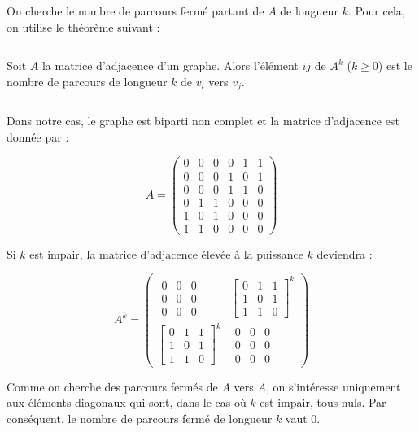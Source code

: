 \begin{solution}
On cherche le nombre de parcours fermé partant de $A$ de longueur $k$.
Pour cela, on utilise le théorème suivant :

$\,$

Soit $A$ la matrice d'adjacence d'un graphe. Alors l'élément $ij$
de $A^{k}$ ($k\geq0$) est le nombre de parcours de longueur $k$
de $v_{i}$ vers $v_{j}$.

$\,$

Dans notre cas, le graphe est biparti non complet et la matrice d'adjacence
est donnée par :

\[
A=\left(\begin{array}{cccccc}
0 & 0 & 0 & 0 & 1 & 1\\
0 & 0 & 0 & 1 & 0 & 1\\
0 & 0 & 0 & 1 & 1 & 0\\
0 & 1 & 1 & 0 & 0 & 0\\
1 & 0 & 1 & 0 & 0 & 0\\
1 & 1 & 0 & 0 & 0 & 0
\end{array}\right)
\]


Si $k$ est impair, la matrice d'adjacence élevée à la puissance $k$
deviendra :

\[
A^{k}=\left(\begin{array}{cc}
\begin{array}{ccc}
0 & 0 & 0\\
0 & 0 & 0\\
0 & 0 & 0
\end{array} & \left[\begin{array}{ccc}
0 & 1 & 1\\
1 & 0 & 1\\
1 & 1 & 0
\end{array}\right]^{k}\\
\left[\begin{array}{ccc}
0 & 1 & 1\\
1 & 0 & 1\\
1 & 1 & 0
\end{array}\right]^{k} & \begin{array}{ccc}
0 & 0 & 0\\
0 & 0 & 0\\
0 & 0 & 0
\end{array}
\end{array}\right)
\]


Comme on cherche des parcours fermés de $A$ vers $A$, on s'intéresse uniquement
aux éléments diagonaux qui sont, dans le cas où $k$ est impair, tous
nuls. Par conséquent, le nombre de parcours fermé de longueur $k$
vaut 0.


\end{solution}
